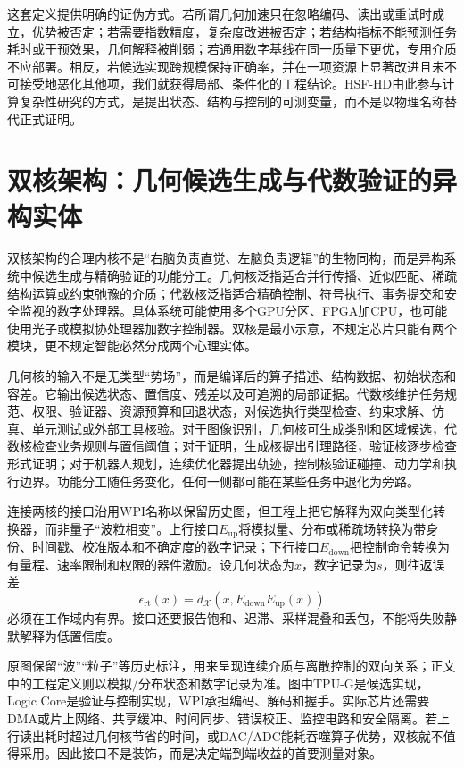 这套定义提供明确的证伪方式。若所谓几何加速只在忽略编码、读出或重试时成立，优势被否定；若需要指数精度，复杂度改进被否定；若结构指标不能预测任务耗时或干预效果，几何解释被削弱；若通用数字基线在同一质量下更优，专用介质不应部署。相反，若候选实现跨规模保持正确率，并在一项资源上显著改进且未不可接受地恶化其他项，我们就获得局部、条件化的工程结论。HSF-HD由此参与计算复杂性研究的方式，是提出状态、结构与控制的可测变量，而不是以物理名称替代正式证明。

\section{双核架构：几何候选生成与代数验证的异构实体}
\label{sec:dual_core_architecture}

双核架构的合理内核不是“右脑负责直觉、左脑负责逻辑”的生物同构，而是异构系统中候选生成与精确验证的功能分工。几何核泛指适合并行传播、近似匹配、稀疏结构运算或约束弛豫的介质；代数核泛指适合精确控制、符号执行、事务提交和安全监视的数字处理器。具体系统可能使用多个GPU分区、FPGA加CPU，也可能使用光子或模拟协处理器加数字控制器。双核是最小示意，不规定芯片只能有两个模块，更不规定智能必然分成两个心理实体。

几何核的输入不是无类型“势场”，而是编译后的算子描述、结构数据、初始状态和容差。它输出候选状态、置信度、残差以及可追溯的局部证据。代数核维护任务规范、权限、验证器、资源预算和回退状态，对候选执行类型检查、约束求解、仿真、单元测试或外部工具核验。对于图像识别，几何核可生成类别和区域候选，代数核检查业务规则与置信阈值；对于证明，生成核提出引理路径，验证核逐步检查形式证明；对于机器人规划，连续优化器提出轨迹，控制核验证碰撞、动力学和执行边界。功能分工随任务变化，任何一侧都可能在某些任务中退化为旁路。

连接两核的接口沿用WPI名称以保留历史图，但工程上把它解释为双向类型化转换器，而非量子“波粒相变”。上行接口$E_{\mathrm{up}}$将模拟量、分布或稀疏场转换为带身份、时间戳、校准版本和不确定度的数字记录；下行接口$E_{\mathrm{down}}$把控制命令转换为有量程、速率限制和权限的器件激励。设几何状态为$x$，数字记录为$s$，则往返误差
\[
\epsilon_{\mathrm{rt}}(x)=
d_{\mathcal X}\!\left(
x,E_{\mathrm{down}}E_{\mathrm{up}}(x)
\right)
\]
必须在工作域内有界。接口还要报告饱和、迟滞、采样混叠和丢包，不能将失败静默解释为低置信度。



原图保留“波”“粒子”等历史标注，用来呈现连续介质与离散控制的双向关系；正文中的工程定义则以模拟/分布状态和数字记录为准。图中TPU-G是候选实现，Logic Core是验证与控制实现，WPI承担编码、解码和握手。实际芯片还需要DMA或片上网络、共享缓冲、时间同步、错误校正、监控电路和安全隔离。若上行读出耗时超过几何核节省的时间，或DAC/ADC能耗吞噬算子优势，双核就不值得采用。因此接口不是装饰，而是决定端到端收益的首要测量对象。

